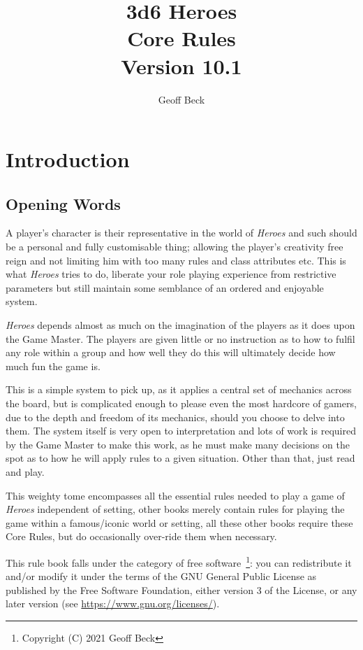 \documentclass[a4paper,10pt,oneside]{book}
\title{\textbf{\huge 3d6 Heroes \\Core Rules \\Version 10.1}}
\author{Geoff Beck}
\date{}
\begin{document}
\maketitle
\frontmatter
\tableofcontents
\mainmatter

\chapter{Introduction}

\section{Opening Words}
A player's character is their representative in the world of \textit{Heroes} and such should be a personal and fully customisable thing; allowing the player's creativity free reign and not limiting him with too many rules and class attributes etc. This is what \textit{Heroes} tries to do, liberate your role playing experience from restrictive parameters but still maintain some semblance of an ordered and enjoyable system.

\textit{Heroes} depends almost as much on the imagination of the players as it does upon the Game Master. The players are given little or no instruction as to how to fulfil any role within a group and how well they do this will ultimately decide how much fun the game is.

This is a simple system to pick up, as it applies a central set of mechanics across the board, but is complicated enough to please even the most hardcore of gamers, due to the depth and freedom of its mechanics, should you choose to delve into them. The system itself is very open to interpretation and lots of work is required by the Game Master to make this work, as he must make many decisions on the spot as to how he will apply rules to a given situation. Other than that, just read and play.

This weighty tome encompasses all the essential rules needed to play a game of \textit{Heroes} independent of setting, other books merely contain rules for playing the game within a famous/iconic world or setting, all these other books require these Core Rules, but do occasionally over-ride them when necessary.

This rule book falls under the category of free software~\footnote{Copyright (C) 2021  Geoff Beck}: you can redistribute it and/or modify
it under the terms of the GNU General Public License as published by
the Free Software Foundation, either version 3 of the License, or any later version (see \url{https://www.gnu.org/licenses/}).
\end{document}
